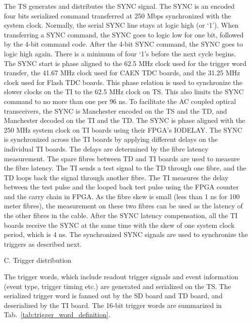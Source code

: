 The TS generates and distributes the SYNC signal.  The SYNC is an encoded four bits serialized command transferred at 250 Mbps synchronized with the system clock.  Normally, the serial SYNC line stays at logic high (or ‘1’).  When transferring a SYNC command, the SYNC goes to logic low for one bit, followed by the 4-bit command code.  After the 4-bit SYNC command, the SYNC goes to logic high again.  There is a minimum of four ‘1’s before the next cycle begins.  The SYNC start is phase aligned to the 62.5 MHz clock used for the trigger word transfer, the 41.67 MHz clock used for CAEN TDC boards, and the 31.25 MHz clock used for Flash TDC boards.  This phase relation is used to synchronize the slower clocks on the TI to the 62.5 MHz clock on TS.  This also limits the SYNC command to no more than one per 96 ns.  To facilitate the AC coupled optical transceivers, the SYNC is Manchester encoded on the TS and the TD, and Manchester decoded on the TI and the TD.
The SYNC is phase aligned with the 250 MHz system clock on TI boards using their FPGA’s IODELAY.  The SYNC is synchronized across the TI boards by applying different delays on the individual TI boards.  The delays are determined by the fibre latency measurement.  
The spare fibres between TD and TI boards are used to measure the fibre latency.  The TI sends a test signal to the TD through one fibre, and the TD loops back the signal through another fibre.  The TI measures the delay between the test pulse and the looped back test pulse using the FPGA counter and the carry chain in FPGA.  As the fibre skew is small (less than 1 ns for 100 meter fibres), the measurement on these two fibres can be used as the latency of the other fibres in the cable.  
After the SYNC latency compensation, all the TI boards receive the SYNC at the same time with the skew of one system clock period, which is 4 ns.  The synchronized SYNC signals are used to synchronize the triggers as described next.

C.	Trigger distribution

The trigger words, which include readout trigger signals and event information (event type, trigger timing etc.) are generated and serialized on the TS.  The serialized trigger word is fanned out by the SD board and TD board, and deserialized by the TI board.  The 16-bit trigger words are summarized in Tab.~\ref{tab:trigger_word_definition}.  


